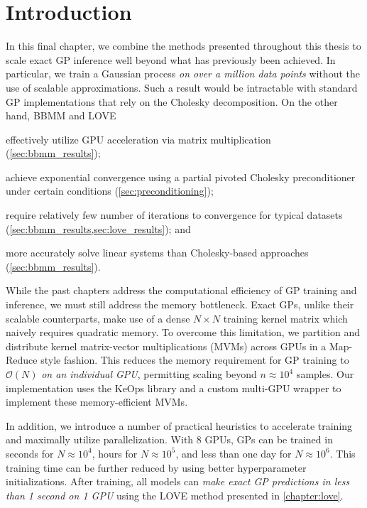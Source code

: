 \section{Introduction}


In this final chapter, we combine the methods presented throughout this thesis to scale exact GP inference well beyond what has previously been achieved.
In particular, we train a Gaussian process \emph{on over a million data points} without the use of scalable approximations.
Such a result would be intractable with standard GP implementations that rely on the Cholesky decomposition.
On the other hand, BBMM and LOVE
\begin{enumerate*}
  \item effectively utilize GPU acceleration via matrix multiplication (\cref{sec:bbmm_results});
  \item achieve exponential convergence using a partial pivoted Cholesky preconditioner under certain conditions (\cref{sec:preconditioning});
  \item require relatively few number of iterations to convergence for typical datasets (\cref{sec:bbmm_results,sec:love_results}); and
  \item more accurately solve linear systems than Cholesky-based approaches (\cref{sec:bbmm_results}).
\end{enumerate*}

While the past chapters address the computational efficiency of GP training and inference, we must still address the memory bottleneck.
Exact GPs, unlike their scalable counterparts, make use of a dense $N \times N$ training kernel matrix which naively requires quadratic memory.
To overcome this limitation, we partition and distribute kernel matrix-vector multiplications (MVMs) across GPUs in a Map-Reduce style fashion.
This reduces the memory requirement for GP training to $\mathcal{O}(N)$ \emph{on an individual GPU}, permitting scaling beyond $n\approx 10^4$ samples.
Our implementation uses the KeOps library \cite{charlier2020kernel} and a custom multi-GPU wrapper to implement these memory-efficient MVMs.

In addition, we introduce a number of practical heuristics to accelerate training and maximally utilize parallelization.
With $8$ GPUs, GPs can be trained in seconds for $N \approx 10^4$, hours for $N \approx 10^5$, and less than one day for $N \approx 10^6$.
This training time can be further reduced by using better hyperparameter initializations.
After training, all models can \emph{make exact GP predictions in less than 1 second on 1 GPU} using the LOVE method presented in \cref{chapter:love}.



